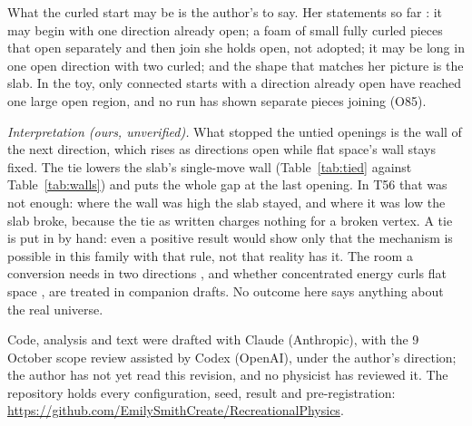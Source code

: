 \documentclass[aps,pre,10pt,twocolumn,superscriptaddress,nofootinbib]{revtex4-2}
\begin{document}
What the curled start may be is the author's to say. Her statements so far \cite{repo}: it may begin with one
direction already open; a foam of small fully curled pieces that open separately and then join she holds open,
not adopted; it may be long in one open direction with two curled; and the shape that matches her
picture is the slab. In the toy, only connected starts with a direction already open have reached one large open
region, and no run has shown separate pieces joining (O85).

\emph{Interpretation (ours, unverified).} What stopped the untied openings is the wall of the next direction, which
rises as directions open while flat space's wall stays fixed. The tie lowers the slab's single-move wall
(Table~\ref{tab:tied} against Table~\ref{tab:walls}) and puts the whole gap at the last opening. In T56 that was not
enough: where the wall was high the slab stayed, and where it was low the slab broke, because the tie as written
charges nothing for a broken vertex. A tie is put in by hand: even a positive result would show only that the
mechanism is possible in this family with that rule, not that reality has it. The room a conversion needs in two directions \cite{paper3}, and whether
concentrated energy curls flat space \cite{paper4}, are treated in companion drafts. No outcome here says anything
about the real universe.

\begin{acknowledgments}
Code, analysis and text were drafted with Claude (Anthropic), with the 9 October scope review assisted by Codex
(OpenAI), under the author's direction; the author has not yet read this revision, and no physicist has
reviewed it. The repository holds
every configuration, seed, result and pre-registration:
\url{https://github.com/EmilySmithCreate/RecreationalPhysics}.
\end{acknowledgments}
\end{document}
